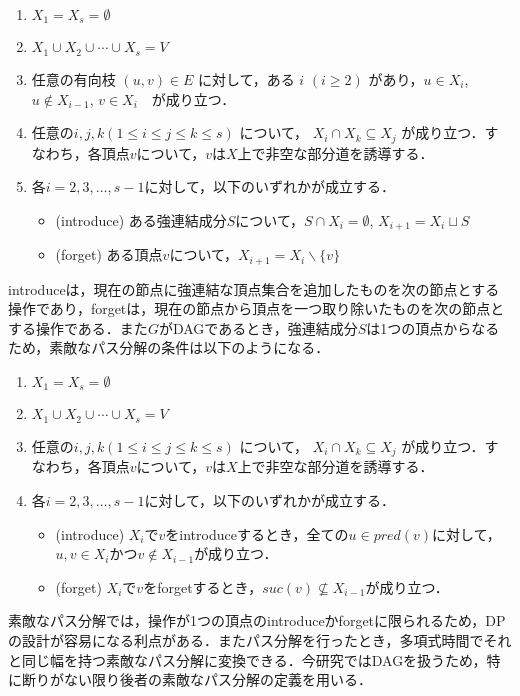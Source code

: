 \documentclass{kuisthesis}           %
\begin{document}
 
 \begin{enumerate}
  \item $X_1 = X_s = \emptyset$
  \item $ X_1 \cup X_2 \cup \cdots \cup X_s = V $ 
  \item 任意の有向枝 $ (u, v) \in E $ に対して，ある $i$ $(i \geq 2)$ があり，$u \in X_i$, $u \notin X_{i-1}$, $v \in X_i$　が成り立つ．
  \item 任意の$ i, j, k (1 \leq i \leq j \leq k \leq s)$ について， $X_i \cap X_k \subseteq X_j$ が成り立つ．すなわち，各頂点$v$について，$v$は$X$上で非空な部分道を誘導する．
  \item 各$i = 2, 3,   \ldots, s-1$に対して，以下のいずれかが成立する．
  \begin{itemize}
      \item (introduce) ある強連結成分$S$について，$S \cap X_i = \emptyset$, $X_{i+1} = X_i \sqcup S$
      \item (forget) ある頂点$v$について，$X_{i+1} = X_i \backslash \{ v \}$
  \end{itemize}
 \end{enumerate}

 
 introduceは，現在の節点に強連結な頂点集合を追加したものを次の節点とする操作であり，forgetは，現在の節点から頂点を一つ取り除いたものを次の節点とする操作である．また$G$がDAGであるとき，強連結成分$S$は1つの頂点からなるため，素敵なパス分解の条件は以下のようになる．
 

 \begin{enumerate}
  \item $X_1 = X_s = \emptyset$
  \item $ X_1 \cup X_2 \cup \cdots \cup X_s = V $ 
  \item 任意の$ i, j, k (1 \leq i \leq j \leq k \leq s)$ について， $X_i \cap X_k \subseteq X_j$ が成り立つ．すなわち，各頂点$v$について，$v$は$X$上で非空な部分道を誘導する．
  \item 各$i = 2, 3,   \ldots, s-1$に対して，以下のいずれかが成立する．
  \begin{itemize}
      \item (introduce) $X_i$で$v$をintroduceするとき，全ての$u \in pred(v)$に対して，$u, v \in X_i$かつ$v \notin X_{i-1}$が成り立つ．
      \item (forget) $X_i$で$v$をforgetするとき，$suc(v) \not\subseteq X_{i-1}$が成り立つ．
  \end{itemize}
 \end{enumerate}

 素敵なパス分解では，操作が1つの頂点のintroduceかforgetに限られるため，DPの設計が容易になる利点がある．またパス分解を行ったとき，多項式時間でそれと同じ幅を持つ素敵なパス分解に変換できる．今研究ではDAGを扱うため，特に断りがない限り後者の素敵なパス分解の定義を用いる．
 
\end{document}
